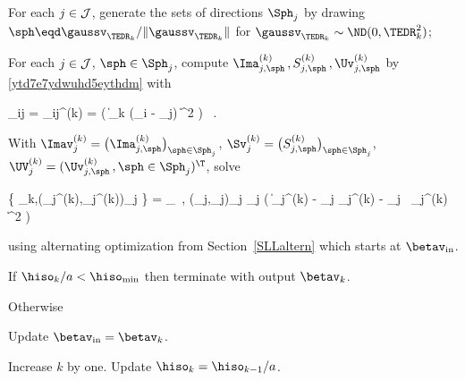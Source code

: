 \begin{mylist}


\item
For each \( j \in \mathcal{J} \),
generate the sets of directions \( \Sph_{j} \) by drawing \( \sph \eqd \gaussv_{\TEDR_{k}}/\| \gaussv_{\TEDR_{k}} \| \)
for \( \gaussv_{\TEDR_{k}} \sim \ND(0,\TEDR_{k}^{2}) \);

\item 
For each \( j \in \mathcal{J} \), \( \sph \in \Sph_{j} \), 
compute \( \Ima_{j,\sph}^{(k)} \, , S_{j,\sph}^{(k)} \, , \Uv_{j,\sph}^{(k)} \)
by \eqref{ytd7e7ydwuhd5eythdm} with
\begin{EQA}[c]
	\weight_{ij} 
	= 
	\weight_{ij}^{(k)}
	= 
	\Kern\bigl( \| \TEDR_{k} (\Xv_{i} - \xv_{j}) \|^{2} \bigr) 
	\, .
\end{EQA}

\item 
With 
\( \Imav_{j}^{(k)} = \bigl( \Ima_{j,\sph}^{(k)} \bigr)_{\sph \in \Sph_{j}} \),
\( \Sv_{j}^{(k)} = \bigl( S_{j,\sph}^{(k)} \bigr)_{\sph \in \Sph_{j}} \),
\( \UV_{j}^{(k)} = (\Uv_{j,\sph}^{(k)} \, , \sph \in \Sph_{j})^{\T} \),
solve
\begin{EQA}[c]
	\bigl\{ \betav_{k},(\fcn_{j}^{(k)},\fcl_{j}^{(k)})_{j \in \JJJ} \bigr\}
	=
	\arginf_{\betav \, , (\fcn_{j},\fclv_{j})_{j \in \JJJ}}
	\sum_{j \in \JJJ} \Bigl( \| \Imav_{j}^{(k)} - \fcn_{j} \Sv_{j}^{(k)} - \fcl_{j} \, \UV_{j}^{(k)} \betav \bigr\|^{2} \Bigr) 
	\, 
	\qquad
\end{EQA}
using alternating optimization from Section~\ref{SLLaltern} which starts at \( \betav_{\init} \).


\item
If \( \hiso_{k}/a < \hiso_{\min} \) then terminate with output \( \betav_{k} \).

\item
Otherwise

\begin{mylist}
\item
Update \( \betav_{\init} = \betav_{k} \).

\item 
Increase \( k \) by one.
Update \( \hiso_{k} = \hiso_{k-1} / a \).


\end{mylist}
\end{mylist}
